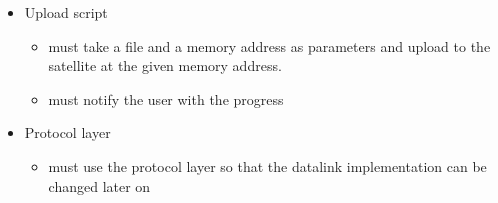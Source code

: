 \begin{itemize}
	\item Upload script
	\begin{itemize}
		\item must take a file and a memory address as parameters and upload to the satellite at the given memory address.
		\item must notify the user with the progress
	\end{itemize}

	\item Protocol layer
	\begin{itemize}
		\item must use the protocol layer so that the datalink implementation can be changed later on
	\end{itemize}

\end{itemize}
